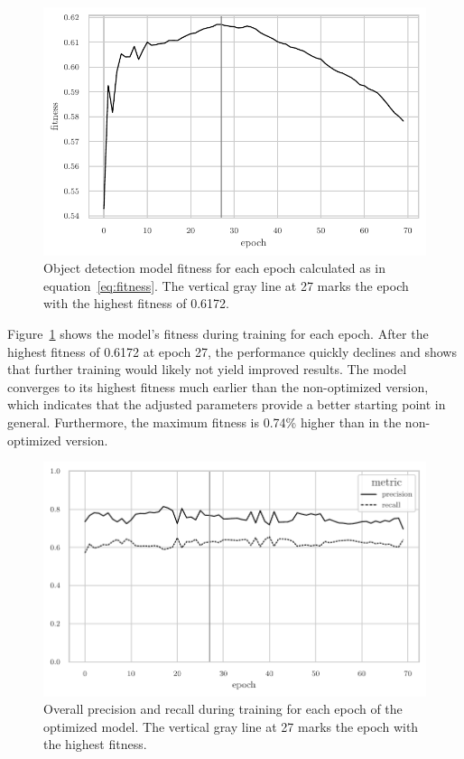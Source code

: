 \documentclass[draft,final]{vutinfth} %
\begin{document}
\begin{figure}
  \centering
  \includegraphics{graphics/model_fitness_final.pdf}
  \caption[Optimized object detection fitness per epoch.]{Object
    detection model fitness for each epoch calculated as in
    equation~\ref{eq:fitness}. The vertical gray line at 27 marks the
    epoch with the highest fitness of 0.6172.}
  \label{fig:hyp-opt-fitness}
\end{figure}

Figure~\ref{fig:hyp-opt-fitness} shows the model's fitness during
training for each epoch. After the highest fitness of 0.6172 at epoch
27, the performance quickly declines and shows that further training
would likely not yield improved results. The model converges to its
highest fitness much earlier than the non-optimized version, which
indicates that the adjusted parameters provide a better starting point
in general. Furthermore, the maximum fitness is 0.74\% higher than in
the non-optimized version.

\begin{figure}
  \centering
  \includegraphics{graphics/precision_recall_final.pdf}
  \caption[Hyper-parameter optimized object detection precision and
  recall during training.]{Overall precision and recall during
    training for each epoch of the optimized model. The vertical gray
    line at 27 marks the epoch with the highest fitness.}
  \label{fig:hyp-opt-prec-rec}
\end{figure}
\end{document}
